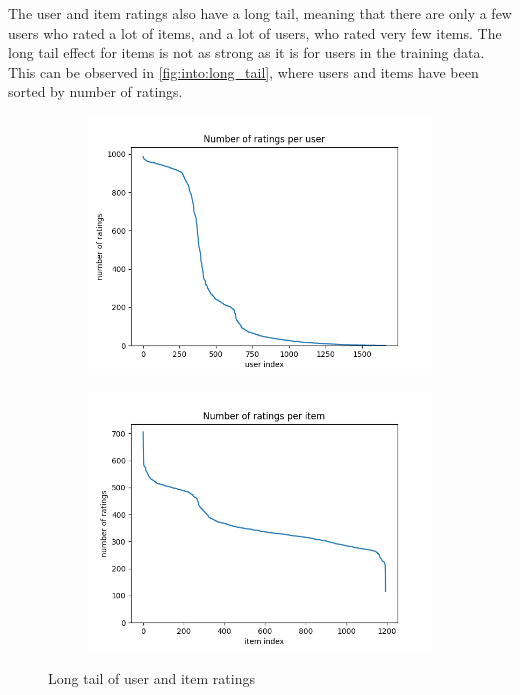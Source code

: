 \documentclass[sigconf]{acmart}
\begin{document}
The user and item ratings also have a long tail, meaning that there are only a few users who rated a lot of items, and a lot of users, who rated very few items.
The long tail effect for items is not as strong as it is for users in the training data.
This can be observed in \autoref{fig:into:long_tail}, where users and items have been sorted by number of ratings.
\begin{figure}[!htb]
	\begin{subfigure}{0.2\textwidth}
		\centering
		\includegraphics[scale=0.23]{user_frequency.png}
	\end{subfigure}
	\begin{subfigure}{0.2\textwidth}
		\centering
		\includegraphics[scale=0.23]{item_frequency.png}
	\end{subfigure}
	\caption{Long tail of user and item ratings}
	\label{fig:into:long_tail}
\end{figure}
\FloatBarrier
\end{document}
